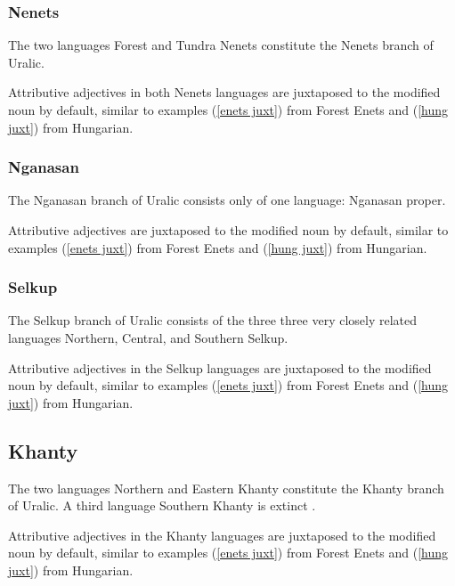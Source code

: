 \subsubsection{Nenets}
The two languages Forest and Tundra Nenets constitute the Nenets branch of Uralic.

Attributive adjectives in both Nenets languages are juxtaposed to the modified noun by default, similar to examples (\ref{enets juxt}) from Forest Enets and (\ref{hung juxt}) from Hungarian.

\subsubsection{Nganasan}
The Nganasan branch of Uralic consists only of one language: Nganasan proper.

Attributive adjectives are juxtaposed to the modified noun by default, similar to examples (\ref{enets juxt}) from Forest Enets and (\ref{hung juxt}) from Hungarian.

\subsubsection{Selkup}
The Selkup branch of Uralic consists of the three three very closely related languages Northern, Central, and Southern Selkup.

Attributive adjectives in the Selkup languages are juxtaposed to the modified noun by default, similar to examples (\ref{enets juxt}) from Forest Enets and (\ref{hung juxt}) from Hungarian.

\subsection{Khanty}
The two languages Northern and Eastern Khanty constitute the Khanty branch of Uralic. A third language Southern Khanty is extinct \citep[231]{salminen2007}.

Attributive adjectives in the Khanty languages are juxtaposed to the modified noun by default, similar to examples (\ref{enets juxt}) from Forest Enets and (\ref{hung juxt}) from Hungarian.

